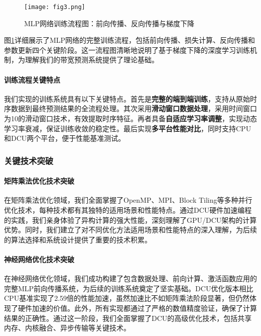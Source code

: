 \documentclass[a4paper]{article}
\begin{document}
\begin{figure}[H]
\centering
\texttt{[image: fig3.png]}
\caption{MLP网络训练流程图：前向传播、反向传播与梯度下降}
\label{fig:mlp_training_flow}
\end{figure}

图\ref{fig:mlp_training_flow}详细展示了MLP网络的完整训练流程，包括前向传播、损失计算、反向传播和参数更新四个关键阶段。这一流程图清晰地说明了基于梯度下降的深度学习训练机制，为理解我们的带宽预测系统提供了理论基础。

\paragraph{训练流程关键特点}

我们实现的训练系统具有以下关键特点。首先是\textbf{完整的端到端训练}，支持从原始时序数据到最终预测结果的全流程处理。其次采用\textbf{滑动窗口数据处理}，采用时间窗口为10的滑动窗口技术，有效提取时序特征。再者具备\textbf{自适应学习率调整}，实现动态学习率衰减，保证训练收敛的稳定性。最后实现\textbf{多平台性能对比}，同时支持CPU和DCU两个平台，便于性能基准测试。

\subsubsection{关键技术突破}

\paragraph{矩阵乘法优化技术突破}

在矩阵乘法优化领域，我们全面掌握了OpenMP、MPI、Block Tiling等多种并行优化技术，每种技术都有其独特的适用场景和性能特点。通过DCU硬件加速编程的实践，我们亲身体验了异构计算的强大性能，深刻理解了GPU/DCU架构的计算优势。同时，我们建立了对不同优化方法适用场景和性能特点的深入理解，为后续的算法选择和系统设计提供了重要的技术积累。

\paragraph{神经网络优化技术突破}

在神经网络优化领域，我们成功构建了包含数据处理、前向计算、激活函数应用的完整MLP前向传播系统，为后续的训练系统奠定了坚实基础。DCU优化版本相比CPU基准实现了2.59倍的性能加速，虽然加速比不如矩阵乘法阶段显著，但仍然体现了硬件加速的价值。此外，所有实现都通过了严格的数值精度验证，确保了计算结果的正确性。通过这一阶段，我们全面掌握了DCU的高级优化技术，包括共享内存、内核融合、异步传输等关键技术。
\end{document}
